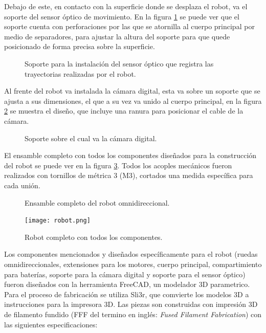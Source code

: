 \documentclass{iccmemoria}
\begin{document}
Debajo de este, en contacto con la superficie donde se desplaza el robot, va el soporte del sensor óptico de movimiento. En la figura \ref{fig:mouse_holder} se puede ver que el soporte cuenta con perforaciones por las que se atornilla al cuerpo principal por medio de separadores, para ajustar la altura del soporte para que quede posicionado de forma precisa sobre la superficie.\\

\begin{figure}[H]
  \centering
  
  \caption[Soporte sensor óptico.]{Soporte para la instalación del sensor óptico que registra las trayectorias realizadas por el robot.}
  \label{fig:mouse_holder}
\end{figure}

Al frente del robot va instalada la cámara digital, esta va sobre un soporte que se ajusta a sus dimensiones, el que a su vez va unido al cuerpo principal, en la figura \ref{fig:camera_holder} se muestra el diseño, que incluye una ranura para posicionar el cable de la cámara.\\

\begin{figure}[H]
  \centering
  
  \caption[Soporte cámara digital.]{Soporte sobre el cual va la cámara digital.}
  \label{fig:camera_holder}
\end{figure}

El ensamble completo con todos los componentes diseñados para la construcción del robot se puede ver en la figura \ref{fig:robot_assembly}. Todos los acoples mecánicos fueron realizados con tornillos de métrica 3 (M3), cortados una medida específica para cada unión.

\begin{figure}[H]
  \centering
  
  \caption[Ensamble robot omnidireccional.]{Ensamble completo del robot omnidireccional.}
  \label{fig:robot_assembly}
\end{figure}

\begin{figure}[H]
  \centering
  \texttt{[image: robot.png]}
  \caption[Robot omnidireccional completo.]{Robot completo con todos los componentes.}
  \label{fig:robot}
\end{figure}

Los componentes mencionados y diseñados específicamente para el robot (ruedas omnidireccionales, extensiones para los motores, cuerpo principal, compartimiento para baterías, soporte para la cámara digital y soporte para el sensor óptico) fueron diseñados con la herramienta FreeCAD, un modelador 3D parametrico. Para el proceso de fabricación se utiliza Sli3r, que comvierte los modelos 3D a instrucciones para la impresora 3D. Las piezas son construidas con impresión 3D de filamento fundido (FFF del termino en inglés: \emph{Fused Filament Fabrication}) con las siguientes especificaciones:\\
\end{document}

